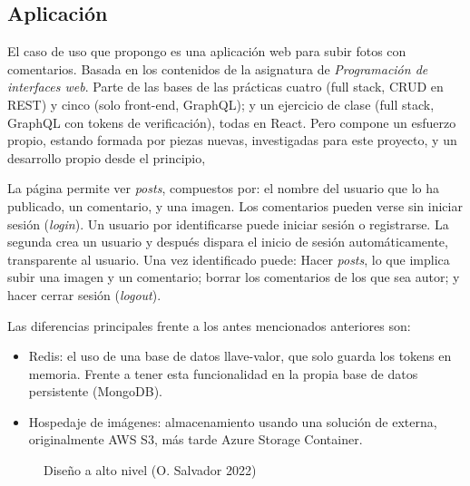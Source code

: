 \documentclass[11pt]{article}
\begin{document}
\begin{flushleft}
\clearpage
\section{Aplicación}
El caso de uso que propongo es una aplicación web para subir fotos con comentarios. Basada en los contenidos de la asignatura de \textit{Programación de interfaces web}. Parte de las bases de las prácticas cuatro (full stack, CRUD en REST) y cinco (solo front-end, GraphQL); y un ejercicio de clase (full stack, GraphQL con tokens de verificación), todas en React. Pero compone un esfuerzo propio, estando formada por piezas nuevas, investigadas para este proyecto, y un desarrollo propio desde el principio, 
\linebreak

La página permite ver \textit{posts}, compuestos por: el nombre del usuario que lo ha publicado, un comentario, y una imagen. Los comentarios pueden verse sin iniciar sesión (\textit{login}). Un usuario por identificarse puede iniciar sesión o registrarse. La segunda crea un usuario y después dispara el inicio de sesión automáticamente, transparente al usuario. Una vez identificado puede: Hacer \textit{posts}, lo que implica subir una imagen y un comentario; borrar los comentarios de los que sea autor; y hacer cerrar sesión (\textit{logout}). 
\linebreak 

Las diferencias principales frente a los antes mencionados anteriores son: 
	\begin{itemize}
		\itemsep0em 
		\item Redis: el uso de una base de datos llave-valor, que solo guarda los tokens en memoria. Frente a tener esta funcionalidad en la propia base de datos persistente (MongoDB).
		\item Hospedaje de imágenes: almacenamiento usando una solución de externa, originalmente AWS S3, más tarde Azure Storage Container.
	\end{itemize}


\linebreak

	\begin{figure}[htb]
		\centering
		\caption{Diseño a alto nivel (O. Salvador 2022)}
	\end{figure}


\end{flushleft}
\end{document}
